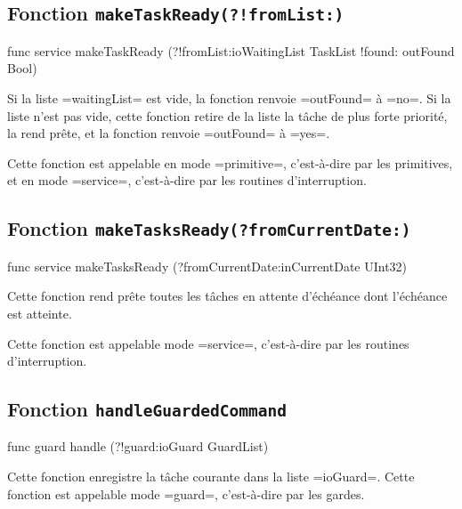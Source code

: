 \subsection{Fonction \texttt{makeTaskReady(?!fromList{}:)}}

\begin{OMNIBUS}
func service makeTaskReady (?!fromList:ioWaitingList TaskList
                            !found: outFound Bool)
\end{OMNIBUS}

Si la liste \omnibus=waitingList= est vide, la fonction renvoie \omnibus=outFound= à \omnibus=no=. Si la liste n'est pas vide, cette fonction retire de la liste la tâche de plus forte priorité, la rend prête, et la fonction renvoie \omnibus=outFound= à \omnibus=yes=.

Cette fonction est appelable en mode \omnibus=primitive=, c'est-à-dire par les primitives, et en mode \omnibus=service=, c'est-à-dire par les routines d'interruption.










\subsection{Fonction \texttt{makeTasksReady(?fromCurrentDate{}:)}}

\begin{OMNIBUS}
func service makeTasksReady (?fromCurrentDate:inCurrentDate UInt32)
\end{OMNIBUS}

Cette fonction rend prête toutes les tâches en attente d'échéance dont l'échéance est atteinte.

Cette fonction est appelable mode \omnibus=service=, c'est-à-dire par les routines d'interruption.






\subsection{Fonction \texttt{handleGuardedCommand}}

\begin{OMNIBUS}
func guard handle (?!guard:ioGuard GuardList)
\end{OMNIBUS}

Cette fonction enregistre la tâche courante dans la liste \omnibus=ioGuard=. Cette fonction est appelable mode \omnibus=guard=, c'est-à-dire par les gardes.








